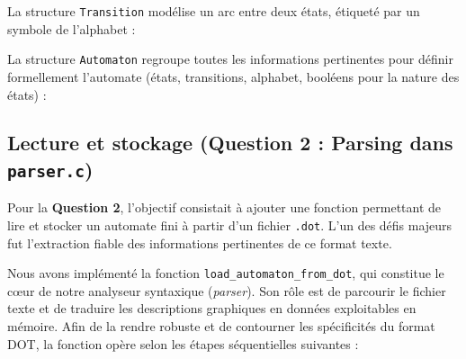 \documentclass[12pt,a4paper]{article}
\begin{document}
La structure \texttt{Transition} modélise un arc entre deux états, étiqueté par un symbole de l'alphabet :


La structure \texttt{Automaton} regroupe toutes les informations pertinentes pour définir formellement l'automate (états, transitions, alphabet, booléens pour la nature des états) :


\subsection{Lecture et stockage (Question 2 : Parsing dans \texttt{parser.c})}
Pour la \textbf{Question 2}, l'objectif consistait à ajouter une fonction permettant de lire et stocker un automate fini à partir d'un fichier \texttt{.dot}. L'un des défis majeurs fut l'extraction fiable des informations pertinentes de ce format texte.

Nous avons implémenté la fonction \texttt{load\_automaton\_from\_dot}, qui constitue le cœur de notre analyseur syntaxique (\textit{parser}). Son rôle est de parcourir le fichier texte et de traduire les descriptions graphiques en données exploitables en mémoire. Afin de la rendre robuste et de contourner les spécificités du format DOT, la fonction opère selon les étapes séquentielles suivantes :
\end{document}
